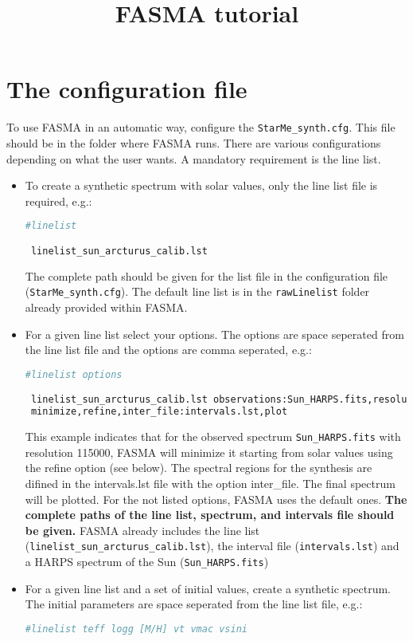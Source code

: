 \documentclass[a4paper,12pt]{article}
\title{FASMA tutorial}
\author{}
\begin{document}
\maketitle


\section{The configuration file}

To use FASMA in an automatic way, configure the \texttt{StarMe\_synth.cfg}. This file should be in the folder where FASMA runs. There are various configurations depending on what the user wants. 
A mandatory requirement is the line list. 

\begin{itemize}
 \item To create a synthetic spectrum with solar values, only the line list file is required, e.g.:
 \begin{lstlisting}[language=Python]
 #linelist

 linelist_sun_arcturus_calib.lst
\end{lstlisting}
The complete path should be given for the list file in the configuration file (\texttt{StarMe\_synth.cfg}). The default line list is in the \texttt{rawLinelist} folder already provided within FASMA.
 \item For a given line list select your options. The options are space seperated from the line list file and the options are comma seperated, e.g.:
 {\footnotesize
 \begin{lstlisting}[language=Python]
 #linelist options

 linelist_sun_arcturus_calib.lst observations:Sun_HARPS.fits,resolution:115000,
 minimize,refine,inter_file:intervals.lst,plot
\end{lstlisting}}
This example indicates that for the observed spectrum \texttt{Sun\_HARPS.fits} with resolution 115000, FASMA will minimize it starting from solar values using the refine option (see below). The 
spectral regions for the synthesis are difined in the intervals.lst file with the option inter\_file. The final spectrum will be plotted. 
For the not listed options, FASMA uses the default ones. {\bf The complete paths of the line list, spectrum, and intervals file should be given.} FASMA already includes the 
line list (\texttt{linelist\_sun\_arcturus\_calib.lst}), the interval file (\texttt{intervals.lst}) and a HARPS spectrum of the Sun (\texttt{Sun\_HARPS.fits})

 \item For a given line list and a set of initial values, create a synthetic spectrum. The initial parameters are space seperated from the line list file, e.g.:
 \begin{lstlisting}[language=Python]
 #linelist teff logg [M/H] vt vmac vsini


\end{lstlisting}
\end{itemize}
\end{document}
